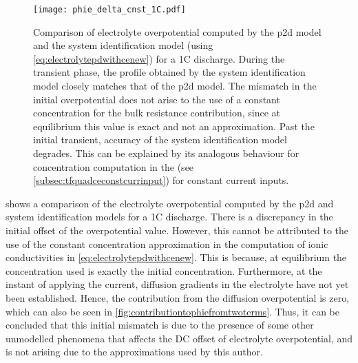\begin{figure}[!htbp]
    \centering
    \texttt{[image: phie\_delta\_cnst\_1C.pdf]}
    \caption[%
    Electrolyte  overpotential  computed  by the    and  system
    identification models for a 1C discharge
    ]%
    {%
        Comparison    of    electrolyte    overpotential   computed    by    the
        \gls{p2d}     model    and     the    system     identification    model
        (using \cref{eq:electrolytepdwithcenew}) for a  1C discharge. During the
        transient phase, the profile obtained by the system identification model
        closely matches that of the \gls{p2d} model. The mismatch in the initial
        overpotential does not arise to the  use of a constant concentration for
        the bulk  resistance contribution,  since at  equilibrium this  value is
        exact and  not an  approximation. Past  the initial  transient, accuracy
        of  the system  identification  model degrades.  This  can be  explained
        by  its  analogous  behaviour   for  concentration  computation  in  the
         (see \cref{subsec:tfquadceconstcurrinput}) for constant
        current inputs.
    }%
    \label{fig:phiedeltacnst1C}
\end{figure}

 shows  a comparison of the  electrolyte overpotential
computed  by   the  \gls{p2d}  and   system  identification  models  for   a  1C
discharge. There  is a discrepancy  in the  initial offset of  the overpotential
value.  However,  this  cannot  be  attributed   to  the  use  of  the  constant
concentration  approximation   in  the   computation  of   ionic  conductivities
in \cref{eq:electrolytepdwithcenew}.  This   is  because,  at   equilibrium  the
concentration used  is exactly  the initial  concentration. Furthermore,  at the
instant of applying the current, diffusion gradients in the electrolyte have not
yet been established.  Hence, the contribution from  the diffusion overpotential
is zero,  which can  also be  seen in \cref{fig:contributiontophiefromtwoterms}.
Thus, it can be  concluded that this initial mismatch is due  to the presence of
some  other unmodelled  phenomena  that  affects the  DC  offset of  electrolyte
overpotential, and is not arising due to the approximations used by this author.

